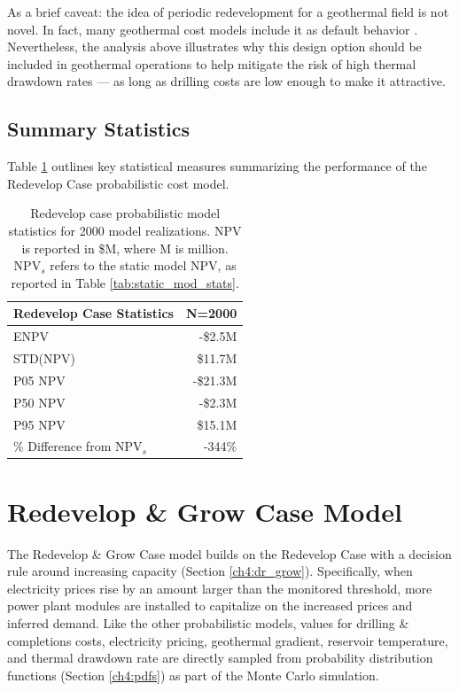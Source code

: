As a brief caveat: the idea of periodic redevelopment for a geothermal field is not novel. In fact, many geothermal cost models include it as default behavior \citep[e.g.,\ ][]{entingh_volume_2006, freeman_system_2018}. Nevertheless, the analysis above illustrates why this design option should be included in geothermal operations to help mitigate the risk of high thermal drawdown rates --- as long as drilling costs are low enough to make it attractive. 

\subsection{Summary Statistics}
\label{ch6:redevelop_stats}

Table \ref{tab:redevelop_stats} outlines key statistical measures summarizing the performance of the Redevelop Case probabilistic cost model.

\begin{table}[H]
\centering
\begin{tabular}{|l|r|}
\hline
\textbf{Redevelop Case Statistics} & N=2000 \\ \hline
ENPV & -\$2.5M \\ \hline
STD(NPV) & \$11.7M \\ \hline
P05 NPV & -\$21.3M \\ \hline
P50 NPV & -\$2.3M \\ \hline
P95 NPV & \$15.1M \\ \hline
\% Difference from NPV$_{s}$ & -344\% \\ \hline
\end{tabular}
\caption[Probabilistic Redevelop Case statistics]{Redevelop case probabilistic model statistics for 2000 model realizations. NPV is reported in \$M, where M is million. NPV$_s$ refers to the static model NPV, as reported in Table \ref{tab:static_mod_stats}.}
\label{tab:redevelop_stats}
\end{table}

\section{Redevelop \& Grow Case Model}
\label{ch6:grow_case}

The Redevelop \& Grow Case model builds on the Redevelop Case with a decision rule around increasing capacity (Section \ref{ch4:dr_grow}). Specifically, when electricity prices rise by an amount larger than the monitored threshold, more power plant modules are installed to capitalize on the increased prices and inferred demand. Like the other probabilistic models, values for drilling \& completions costs, electricity pricing, geothermal gradient, reservoir temperature, and thermal drawdown rate are directly sampled from probability distribution functions (Section \ref{ch4:pdfs}) as part of the Monte Carlo simulation.

